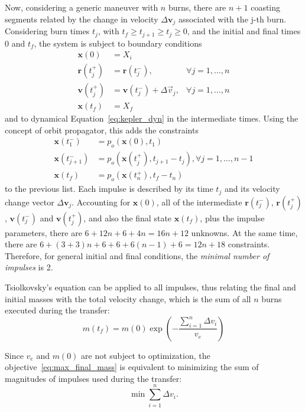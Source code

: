 Now, considering a generic maneuver with \(n\) burns, there are \(n+1\) coasting segments related by the change in velocity \(\Delta \mathbf{v}_j\) associated with the j-th burn. Considering burn times \(t_j\), with \(t_f \geq t_{j+1} \geq t_j \geq 0\), and the initial and final times \(0\) and \(t_f\), the system is subject to boundary conditions
\begin{align}
    \mathbf{x}(0) &= X_i \\
    \mathbf{r}(t_j^+) &= \mathbf{r}(t_j^-),& \forall j=1,\dots,n \\
    \mathbf{v}(t_j^+) &= \mathbf{v}(t_j^-) + \Delta \vec v_j,& \forall j=1,\dots,n \\
    \mathbf{x}(t_f) &= X_f
\end{align}
and to dynamical Equation~\eqref{eq:kepler_dyn} in the intermediate times. Using the concept of orbit propagator, this adds the constraints
\begin{align}
    \mathbf{x}(t_1^-) &= p_o(\mathbf{x}(0), t_1) \\
    \mathbf{x}(t_{j+1}^-) &= p_o(\mathbf{x}(t_j^+), t_{j+1} - t_j), \forall j = 1, \dots, n-1 \\
    \mathbf{x}(t_f) &= p_o(\mathbf{x}(t_n^+), t_f - t_n)
\end{align}
to the previous list. Each impulse is described by its time \(t_j\) and its velocity change vector \(\Delta \mathbf{v}_j\). Accounting for \(\mathbf{x}(0)\), all of the intermediate \(\mathbf{r}(t_j^-)\), \(\mathbf{r}(t_j^+)\), \(\mathbf{v}(t_j^-)\) and \(\mathbf{v}(t_j^+)\), and also the final state \(\mathbf{x}(t_f)\), plus the impulse parameters, there are \(6 + 12n + 6 + 4n = 16n + 12\) unknowns. At the same time, there are \(6 + (3 + 3)n + 6 + 6 + 6(n-1) + 6 = 12n + 18\) constraints. Therefore, for general initial and final conditions, the \textit{minimal number of impulses} is 2. 


Tsiolkovsky's equation can be applied to all impulses, thus relating the final and initial masses with the total velocity change, which is the sum of all \(n\) burns executed during the transfer:
\begin{equation}
    m(t_f) = m(0) \exp{\left(-\frac{\sum_{i=1}^{n}\Delta v_i}{v_e}\right)}
\end{equation}

Since \(v_e\) and \(m(0)\) are not subject to optimization, the objective~\eqref{eq:max_final_mass} is equivalent to minimizing the sum of magnitudes of impulses used during the transfer:
\begin{equation}
    \min \sum_{i=1}^{n} \Delta v_i.
\end{equation}

